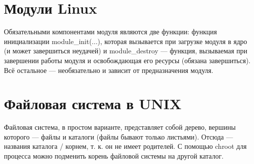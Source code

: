 \documentclass[main]{subfiles}
\begin{document}
\section{Модули Linux}
Обязательными компонентами модуля являются две функции: функция инициализации
module\_init(...), которая вызывается при загрузке модуля в ядро (и может
завершиться неудачей) и module\_destroy --- функция, вызываемая при завершении
работы модуля и освобождающая его ресурсы (обязана завершиться).
Всё остальное --- необязательно и зависит от предназначения модуля.

\section{Файловая система в UNIX}
Файловая система, в простом варианте, представляет собой дерево, вершины
которого --- файлы и каталоги (файлы бывают только листьями).
Отсюда --- названия каталога / корнем, т. к. он не имеет родителей.
С помощью chroot для процесса можно подменить корень файловой системы
на другой каталог.
\end{document}
